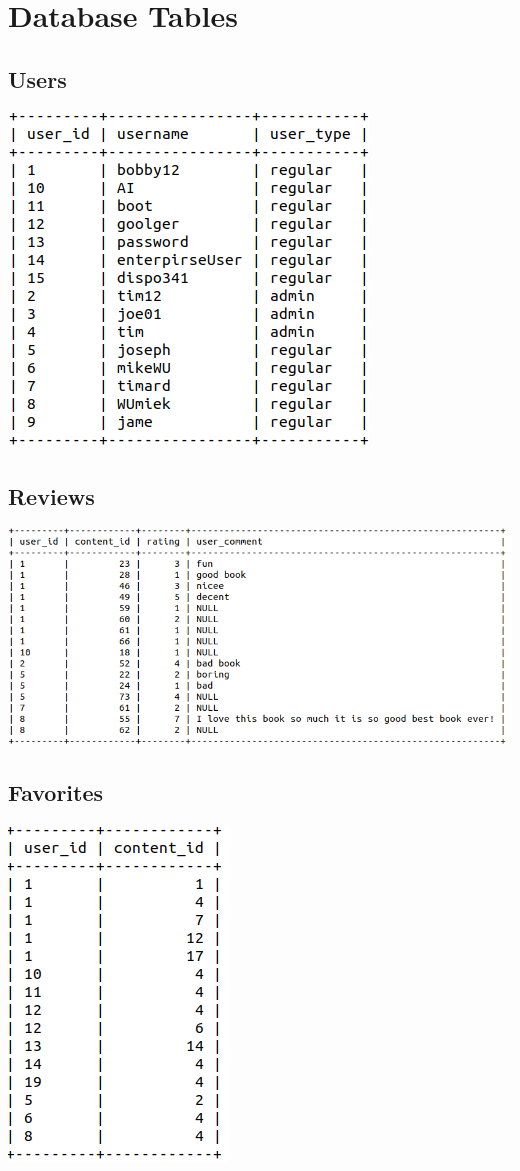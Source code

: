\documentclass[letter, 12pt, titlepage]{article}
\begin{document}
	\section{Database Tables}
		\subsection{Users}
			\includegraphics[scale=.5]{users.png}
		\subsection{Reviews}
			\includegraphics[scale=.5]{reviews.png}
		\subsection{Favorites}
			\includegraphics[scale=.5]{favorites.png}
\end{document}
